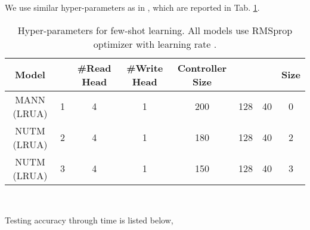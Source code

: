\documentclass[english]{article}
\providecommand{\tabularnewline}{\\}
\begin{document}
We use similar hyper-parameters as in \citet{santoro2016meta} , which
are reported in Tab. \ref{tab:NUTM-hyper-parameters-for-1}.

\begin{table}[H]
\begin{centering}
\begin{tabular}{cccccccc}
\hline 
Model &  & \#Read Head & \#Write Head & Controller Size &  &  &  Size\tabularnewline
\hline 
MANN (LRUA) & 1 & 4 & 1 & 200 & 128 & 40 & 0\tabularnewline
\hline 
NUTM (LRUA) & 2 & 4 & 1 & 180 & 128 & 40 & 2\tabularnewline
\hline 
NUTM (LRUA) & 3 & 4 & 1 & 150 & 128 & 40 & 3\tabularnewline
\hline 
\end{tabular}
\par\end{centering}
~

\caption{Hyper-parameters for few-shot learning. All models use RMSprop optimizer
with learning rate .\label{tab:NUTM-hyper-parameters-for-1}}
\end{table}
Testing accuracy through time is listed below,
\end{document}
